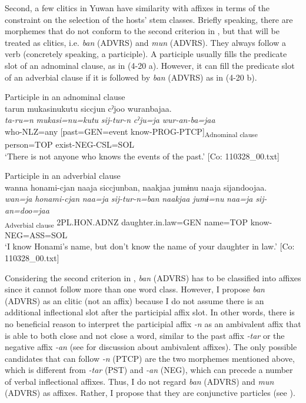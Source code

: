   Second, a few clitics in Yuwan have similarity with affixes in terms of the constraint on the selection of the hosts’ stem classes. Briefly speaking, there are morphemes that do not conform to the second criterion in , but that will be treated as clitics, i.e. \textit{ban} (ADVRS) and \textit{mun} (ADVRS). They always follow a verb (concretely speaking, a participle). A participle usually fills the predicate slot of an adnominal clause, as in (4-20 a). However, it can fill the predicate slot of an adverbial clause if it is followed by \textit{ban} (ADVRS) as in (4-20 b).

\ea\label{ex:4.20} 

\ea \label{ex:4.20a} Participle in an adnominal clause\\
\glll tarun  mukasinukutu  siccjun     cˀjoo  wuranbajaa.\\
    \textit{ta-ru=n}  \textit{mukasi=nu=kutu}  \textit{sij-tur-n}     \textit{cˀju=ja}  \textit{wur-an-ba=jaa}\\
    who-NLZ=any  [past=GEN=event  know-PROG-PTCP]\textsubscript{Adnominal clause}        person=TOP  exist-NEG-CSL=SOL\\
    \glt     ‘There is not anyone who knows the events of the past.’ [Co: 110328\_00.txt]

\ex Participle in an adverbial clause\\\label{ex:4.20b}
\glll   wanna  honami-{\textbar}cjan{\textbar}  naaja  siccjunban, naakjaa  jumɨnu  naaja  sijandoojaa.\\
    \textit{wan=ja}  \textit{honami-cjan}  \textit{naa=ja}  \textit{sij-tur-n=ban}  \textit{naakjaa}  \textit{jumɨ=nu}  \textit{naa=ja}  \textit{sij-an=doo=jaa}\\
    [1SG=TOP  Honami-DIM  name=TOP  know-PROG-PTCP=ADVRS]\textsubscript{Adverbial clause}  2PL.HON.ADNZ  daughter.in.law=GEN  name=TOP  know-NEG=ASS=SOL\\
    \glt     ‘I know Honami’s name, but don’t know the name of your daughter in law.’ [Co: 110328\_00.txt]
    \z
\z

Considering the second criterion in , \textit{ban} (ADVRS) has to be classified into affixes since it cannot follow more than one word class. However, I propose \textit{ban} (ADVRS) as an clitic (not an affix) because I do not assume there is an additional inflectional slot after the participial affix slot. In other words, there is no beneficial reason to interpret the participial affix \textit{{}-n} as an ambivalent affix that is able to both close and not close a word, similar to the past affix \textit{{}-tar} or the negative affix \textit{{}-an} (see  for discussion about ambivalent affixes). The only possible candidates that can follow \textit{{}-n} (PTCP) are the two morphemes mentioned above, which is different from \textit{{}-tar} (PST) and \textit{{}-an} (NEG), which can precede a number of verbal inflectional affixes. Thus, I do not regard \textit{ban} (ADVRS) and \textit{mun} (ADVRS) as affixes. Rather, I propose that they are conjunctive particles (see ).

